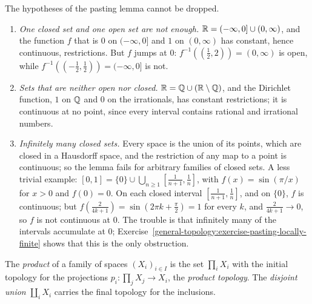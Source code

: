 \begin{counterexample}\label{general-topology:counterexample-pasting}
The hypotheses of the pasting lemma cannot be dropped.
\begin{enumerate}
\item \emph{One closed set and one open set are not enough.} $\mathbb{R} = (-\infty, 0] \cup (0, \infty)$, and the function $f$ that is $0$ on $(-\infty, 0]$ and $1$ on $(0, \infty)$ has constant, hence continuous,
restrictions. But $f$ jumps at $0$: $f^{-1}((\frac12, 2)) = (0, \infty)$ is open, while $f^{-1}((-\frac12, \frac12)) = (-\infty, 0]$ is not.
\item \emph{Sets that are neither open nor closed.} $\mathbb{R} = \mathbb{Q} \cup (\mathbb{R} \setminus \mathbb{Q})$, and the Dirichlet function, $1$ on $\mathbb{Q}$ and $0$ on the irrationals, has constant restrictions; it is continuous at no point,
since every interval contains rational and irrational numbers.
\item \emph{Infinitely many closed sets.} Every space is the union of its points, which are closed in a Hausdorff space, and the restriction of any map to a point is continuous; so the lemma fails for arbitrary families
of closed sets. A less trivial example: $[0, 1] = \{0\} \cup \bigcup_{n \geq 1}[\frac{1}{n+1}, \frac1n]$, with $f(x) = \sin(\pi/x)$ for $x > 0$ and $f(0) = 0$. On each closed interval $[\frac{1}{n+1}, \frac1n]$, and on
$\{0\}$, $f$ is continuous; but $f(\frac{2}{4k+1}) = \sin(2\pi k + \frac\pi2) = 1$ for every $k$, and $\frac{2}{4k+1} \to 0$, so $f$ is not continuous at $0$. The trouble is that infinitely many of the intervals
accumulate at $0$; Exercise~\ref{general-topology:exercise-pasting-locally-finite} shows that this is the only obstruction.
\end{enumerate}
\end{counterexample}

\begin{definition}\label{general-topology:definition-product}
The \emph{product} of a family of spaces $(X_i)_{i \in I}$ is the set $\prod_i X_i$ with the initial topology for the projections
$p_i \colon \prod_j X_j \to X_i$, the \emph{product topology}. The \emph{disjoint union} $\coprod_i X_i$ carries the final topology for the
inclusions.
\end{definition}

